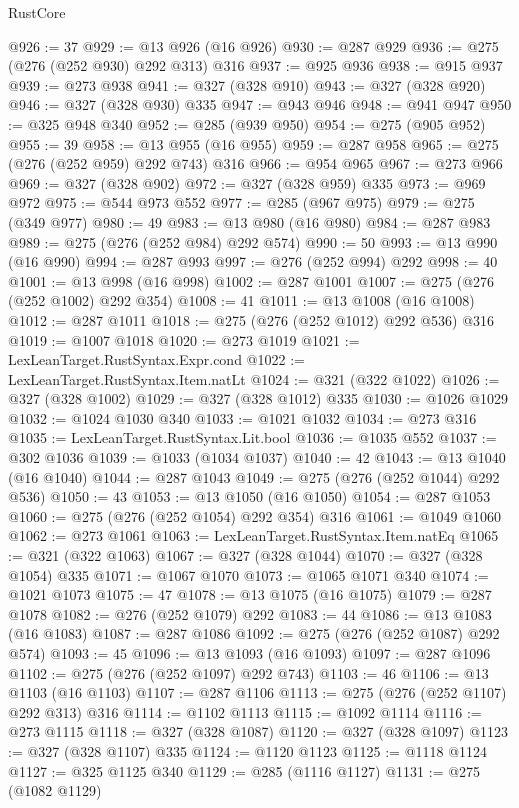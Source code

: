 \begin{lexlean}{RustCore}
\begin{coremodule}
@926 := 37
@929 := @13 @926 (@16 @926)
@930 := @287 @929
@936 := @275 (@276 (@252 @930) @292 @313) @316
@937 := @925 @936
@938 := @915 @937
@939 := @273 @938
@941 := @327 (@328 @910)
@943 := @327 (@328 @920)
@946 := @327 (@328 @930) @335
@947 := @943 @946
@948 := @941 @947
@950 := @325 @948 @340
@952 := @285 (@939 @950)
@954 := @275 (@905 @952)
@955 := 39
@958 := @13 @955 (@16 @955)
@959 := @287 @958
@965 := @275 (@276 (@252 @959) @292 @743) @316
@966 := @954 @965
@967 := @273 @966
@969 := @327 (@328 @902)
@972 := @327 (@328 @959) @335
@973 := @969 @972
@975 := @544 @973 @552
@977 := @285 (@967 @975)
@979 := @275 (@349 @977)
@980 := 49
@983 := @13 @980 (@16 @980)
@984 := @287 @983
@989 := @275 (@276 (@252 @984) @292 @574)
@990 := 50
@993 := @13 @990 (@16 @990)
@994 := @287 @993
@997 := @276 (@252 @994) @292
@998 := 40
@1001 := @13 @998 (@16 @998)
@1002 := @287 @1001
@1007 := @275 (@276 (@252 @1002) @292 @354)
@1008 := 41
@1011 := @13 @1008 (@16 @1008)
@1012 := @287 @1011
@1018 := @275 (@276 (@252 @1012) @292 @536) @316
@1019 := @1007 @1018
@1020 := @273 @1019
@1021 := LexLeanTarget.RustSyntax.Expr.cond
@1022 := LexLeanTarget.RustSyntax.Item.natLt
@1024 := @321 (@322 @1022)
@1026 := @327 (@328 @1002)
@1029 := @327 (@328 @1012) @335
@1030 := @1026 @1029
@1032 := @1024 @1030 @340
@1033 := @1021 @1032
@1034 := @273 @316
@1035 := LexLeanTarget.RustSyntax.Lit.bool
@1036 := @1035 @552
@1037 := @302 @1036
@1039 := @1033 (@1034 @1037)
@1040 := 42
@1043 := @13 @1040 (@16 @1040)
@1044 := @287 @1043
@1049 := @275 (@276 (@252 @1044) @292 @536)
@1050 := 43
@1053 := @13 @1050 (@16 @1050)
@1054 := @287 @1053
@1060 := @275 (@276 (@252 @1054) @292 @354) @316
@1061 := @1049 @1060
@1062 := @273 @1061
@1063 := LexLeanTarget.RustSyntax.Item.natEq
@1065 := @321 (@322 @1063)
@1067 := @327 (@328 @1044)
@1070 := @327 (@328 @1054) @335
@1071 := @1067 @1070
@1073 := @1065 @1071 @340
@1074 := @1021 @1073
@1075 := 47
@1078 := @13 @1075 (@16 @1075)
@1079 := @287 @1078
@1082 := @276 (@252 @1079) @292
@1083 := 44
@1086 := @13 @1083 (@16 @1083)
@1087 := @287 @1086
@1092 := @275 (@276 (@252 @1087) @292 @574)
@1093 := 45
@1096 := @13 @1093 (@16 @1093)
@1097 := @287 @1096
@1102 := @275 (@276 (@252 @1097) @292 @743)
@1103 := 46
@1106 := @13 @1103 (@16 @1103)
@1107 := @287 @1106
@1113 := @275 (@276 (@252 @1107) @292 @313) @316
@1114 := @1102 @1113
@1115 := @1092 @1114
@1116 := @273 @1115
@1118 := @327 (@328 @1087)
@1120 := @327 (@328 @1097)
@1123 := @327 (@328 @1107) @335
@1124 := @1120 @1123
@1125 := @1118 @1124
@1127 := @325 @1125 @340
@1129 := @285 (@1116 @1127)
@1131 := @275 (@1082 @1129)

\end{coremodule}
\end{lexlean}
